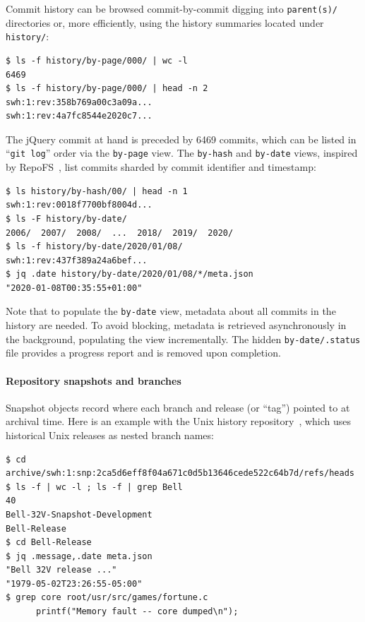 Commit history can be browsed commit-by-commit digging into \texttt{parent(s)/}
directories or, more efficiently, using the history summaries located under
\texttt{history/}:

\begin{verbatim}
$ ls -f history/by-page/000/ | wc -l
6469
$ ls -f history/by-page/000/ | head -n 2
swh:1:rev:358b769a00c3a09a...
swh:1:rev:4a7fc8544e2020c7...
\end{verbatim}

The jQuery commit at hand is preceded by \num{6469} commits, which can be
listed in ``\texttt{git log}'' order via the \texttt{by-page} view. The
\texttt{by-hash} and \texttt{by-date} views, inspired by
RepoFS~\cite{spinellis2019repofs}, list commits sharded by commit identifier
and timestamp:

\begin{verbatim}
$ ls history/by-hash/00/ | head -n 1
swh:1:rev:0018f7700bf8004d...
$ ls -F history/by-date/
2006/  2007/  2008/  ...  2018/  2019/  2020/
$ ls -f history/by-date/2020/01/08/
swh:1:rev:437f389a24a6bef...
$ jq .date history/by-date/2020/01/08/*/meta.json
"2020-01-08T00:35:55+01:00"
\end{verbatim}

Note that to populate the \texttt{by-date} view, metadata about all commits in
the history are needed. To avoid blocking, metadata is retrieved asynchronously
in the background, populating the view incrementally. The hidden
\texttt{by-date/.status} file provides a progress report and is removed upon
completion.


\paragraph{Repository snapshots and branches}

Snapshot objects record where each branch and release (or ``tag'') pointed to
at archival time. Here is an example with the Unix history
repository~\cite{SpinellisUnix2017}, which uses historical Unix releases as
nested branch names:

\begin{verbatim}
$ cd archive/swh:1:snp:2ca5d6eff8f04a671c0d5b13646cede522c64b7d/refs/heads
$ ls -f | wc -l ; ls -f | grep Bell
40
Bell-32V-Snapshot-Development
Bell-Release
$ cd Bell-Release
$ jq .message,.date meta.json
"Bell 32V release ..."
"1979-05-02T23:26:55-05:00"
$ grep core root/usr/src/games/fortune.c
      printf("Memory fault -- core dumped\n");
\end{verbatim}

